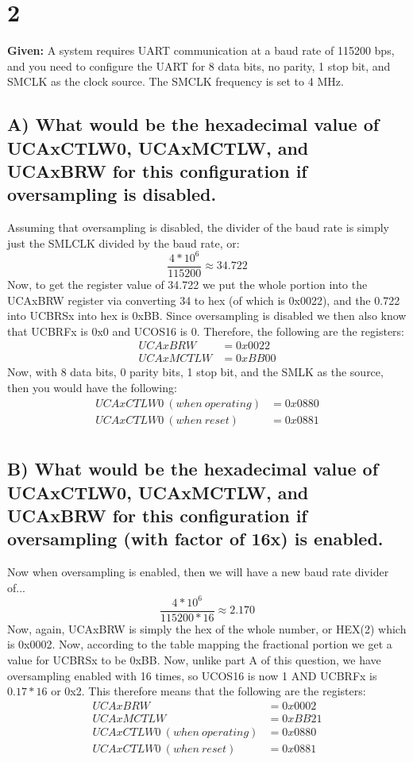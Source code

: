 \documentclass{article}
\begin{document}
\pagebreak
\section{2}
\textbf{Given:} A system requires UART communication at a baud rate of 115200 bps, and you need to configure the UART for 8 data bits, no parity, 1 stop bit, and SMCLK as the clock source. The SMCLK frequency is set to 4 MHz.

\subsection{A) What would be the hexadecimal value of UCAxCTLW0, UCAxMCTLW, and UCAxBRW for this configuration if oversampling is disabled.}
Assuming that oversampling is disabled, the divider of the baud rate is simply just the SMLCLK divided by the baud rate, or:
$$ \frac{4*10^6}{115200} \approx 34.722 $$
Now, to get the register value of 34.722 we put the whole portion into the UCAxBRW register via converting 34 to hex (of which is 0x0022), and the 0.722 into UCBRSx into hex is 0xBB. Since oversampling is disabled we then also know that UCBRFx is 0x0 and UCOS16 is 0. Therefore, the following are the registers:
\begin{align*}
UCAxBRW &= 0x0022 \\
UCAxMCTLW &= 0xBB00
\end{align*}
Now, with 8 data bits, 0 parity bits, 1 stop bit, and the SMLK as the source, then you would have the following:
\begin{align*}
UCAxCTLW0\ (when\ operating) &= 0x0880 \\
UCAxCTLW0\ (when\ reset) &= 0x0881 \\
\end{align*}

\subsection{B) What would be the hexadecimal value of UCAxCTLW0, UCAxMCTLW, and UCAxBRW for this configuration if oversampling (with factor of 16x) is enabled.}
Now when oversampling is enabled, then we will have a new baud rate divider of...
$$ \frac{4*10^6}{115200*16} \approx 2.170 $$
Now, again, UCAxBRW is simply the hex of the whole number, or HEX(2) which is 0x0002. Now, according to the table mapping the fractional portion we get a value for UCBRSx to be 0xBB. Now, unlike part A of this question, we have oversampling enabled with 16 times, so UCOS16 is now 1 AND UCBRFx is $0.17 * 16$ or 0x2. This therefore means that the following are the registers:
\begin{align*}
UCAxBRW &= 0x0002 \\
UCAxMCTLW &= 0xBB21 \\
UCAxCTLW0\ (when\ operating) &= 0x0880 \\
UCAxCTLW0\ (when\ reset) &= 0x0881 \\
\end{align*}
\end{document}
